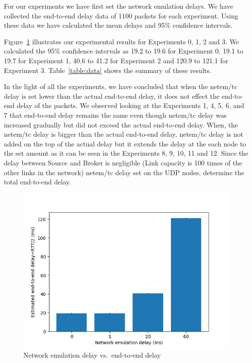 \documentclass[conference]{IEEEtran}
\begin{document}
For our experiments we have first set the network emulation delays. We have collected the end-to-end delay data of 1100 packets for each experiment. Using these data we have calculated the mean delays and 95\% confidence intervals.

Figure~\ref{fig:graph} illustrates our experimental results for Experiments 0, 1, 2 and 3.
We calculated the 95\% confidence intervals as 19.2 to 19.6 for Experiment 0,
19.1 to 19.7 for Experiment 1, 40.6 to 41.2 for Experiment 2 and 120.9 to 121.1
for Experiment 3. Table~\ref{table:data} shows the summary of these results.

In the light of all the experiments, we have concluded that when the netem/tc delay is set lower than the actual end-to-end delay, it does not effect the end-to-end delay of the packets. We observed looking at the Experiments 1, 4, 5, 6, and 7 that end-to-end delay remains the same even though netem/tc delay was increased gradually but did not exceed the actual end-to-end delay. When, the netem/tc delay is bigger than the actual end-to-end delay, netem/tc delay is not added on the top of the actual delay but it extends the delay at the each node to the set amount as it can be seen in the Experiments 8, 9, 10, 11 and 12. Since the delay between Source and Broker is negligible (Link capacity is 100 times of the other links in the network) netem/tc delay set on the UDP nodes, determine the total end-to-end delay.

\begin{figure}
    \centering
    \includegraphics[scale=0.6]{graphics/plt}
    \caption{Network emulation delay vs.\ end-to-end delay}\label{fig:graph}
\end{figure}
\end{document}
